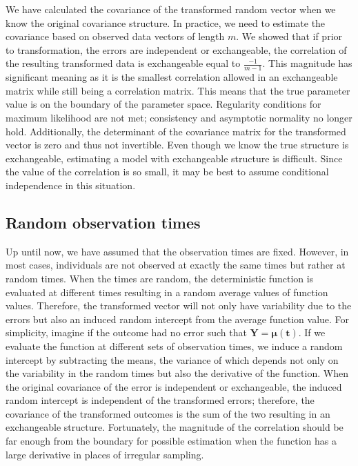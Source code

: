 \documentclass[12pt]{article}
\newcommand{\B}[0]{\mathbf}
\newcommand{\bs}[0]{\boldsymbol}
\begin{document}
We have calculated the covariance of the transformed random vector when we know the original covariance structure. In practice, we need to estimate the covariance based on observed data vectors of length $m$. We showed that if prior to transformation, the errors are independent or exchangeable, the correlation of the resulting transformed data is exchangeable equal to $\frac{-1}{m-1}$. This magnitude has significant meaning as it is the smallest correlation allowed in an exchangeable matrix while still being a correlation matrix. This means that the true parameter value is on the boundary of the parameter space. Regularity conditions for maximum likelihood are not met; consistency and asymptotic normality no longer hold. Additionally, the determinant of the covariance matrix for the transformed vector is zero and thus not invertible. Even though we know the true structure is exchangeable, estimating a model with exchangeable structure is difficult. Since the value of the correlation is so small, it may be best to assume conditional independence in this situation. 
 
\subsection{Random observation times} 
Up until now, we have assumed that the observation times are fixed. However, in most cases, individuals are not observed at exactly the same times but rather at random times. When the times are random, the deterministic function is evaluated at different times resulting in a random average values of function values. Therefore, the transformed vector will not only have variability due to the errors but also an induced random intercept from the average function value. For simplicity, imagine if the outcome had no error such that
$\B Y =  \bs\mu(\B t). $
If we evaluate the function at different sets of observation times, we induce a random intercept by subtracting the means, the variance of which depends not only on the variability in the random times but also the derivative of the function. When the original covariance of the error is independent or exchangeable, the induced random intercept is independent of the transformed errors; therefore, the covariance of the transformed outcomes is the sum of the two resulting in an exchangeable structure. Fortunately, the magnitude of the correlation should be far enough from the boundary for possible estimation when the function has a large derivative in places of irregular sampling.
\end{document}
